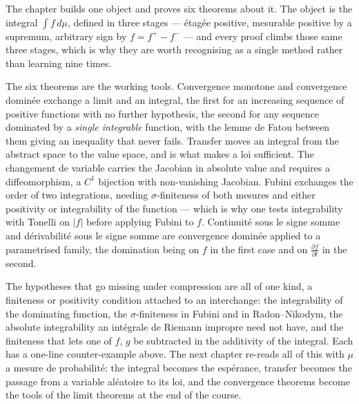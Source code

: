 \begin{conclusion}
  The chapter builds one object and proves six theorems about it. The object is the
  integral $\int f \, d\mu$, defined in three stages --- étagée positive, mesurable
  positive by a supremum, arbitrary sign by $f = f^{+} - f^{-}$ --- and every proof
  climbs those same three stages, which is why they are worth recognising as a single
  method rather than learning nine times.

  The six theorems are the working tools. Convergence monotone and convergence
  dominée exchange a limit and an integral, the first for an increasing sequence of
  positive functions with no further hypothesis, the second for any sequence
  dominated by a \emph{single integrable} function, with the lemme de Fatou between
  them giving an inequality that never fails. Transfer moves an integral from the
  abstract space to the value space, and is what makes a loi sufficient. The
  changement de variable carries the Jacobian in absolute value and requires a
  diffeomorphism, a $C^{1}$ bijection with non-vanishing Jacobian. Fubini exchanges
  the order of two integrations, needing $\sigma$-finiteness of both mesures and
  either positivity or integrability of the function --- which is why one tests
  integrability with Tonelli on $|f|$ before applying Fubini to $f$. Continuité sous
  le signe somme and dérivabilité sous le signe somme are convergence dominée applied
  to a parametrised family, the domination being on $f$ in the first case and on
  $\frac{\partial f}{\partial t}$ in the second.

  The hypotheses that go missing under compression are all of one kind, a finiteness
  or positivity condition attached to an interchange: the integrability of the
  dominating function, the $\sigma$-finiteness in Fubini and in Radon--Nikodym, the
  absolute integrability an intégrale de Riemann impropre need not have, and the
  finiteness that lets one of $f$, $g$ be subtracted in the additivity of the
  integral. Each has a one-line counter-example above. The next chapter re-reads all
  of this with $\mu$ a mesure de probabilité: the integral becomes the espérance,
  transfer becomes the passage from a variable aléatoire to its loi, and the
  convergence theorems become the tools of the limit theorems at the end of the
  course.
\end{conclusion}
